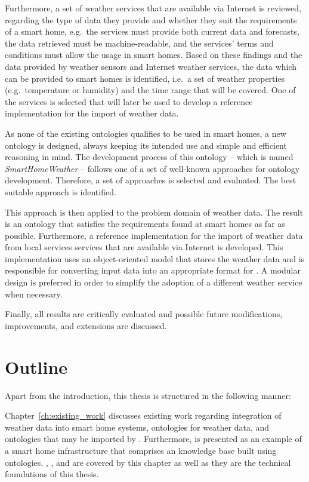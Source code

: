 Furthermore, a set of weather services that are available via Internet is reviewed, regarding the type of data they provide and whether they suit the requirements of a smart home, e.g.\ the services must provide both current data and forecasts, the data retrieved must be machine-readable, and the services' terms and conditions must allow the usage in smart homes. Based on these findings and the data provided by weather sensors and Internet weather services, the data which can be provided to smart homes is identified, i.e.\ a set of weather properties (e.g.\ temperature or humidity) and the time range that will be covered. One of the services is selected that will later be used to develop a reference implementation for the import of weather data.

As none of the existing ontologies qualifies to be used in smart homes, a new  ontology is designed, always keeping its intended use and simple and efficient reasoning in mind. The development process of this ontology -- which is named \emph{SmartHomeWeather} -- follows one of a set of well-known approaches for ontology development. Therefore, a set of approaches is selected and evaluated. The best suitable approach is identified.

This approach is then applied to the problem domain of weather data. The result is an ontology that satisfies the requirements found at smart homes as far as possible. Furthermore, a reference implementation for the import of weather data from local services services that are available via Internet is developed. This implementation uses an object-oriented model that stores the weather data and is responsible for converting input data into an appropriate format for \smarthomeweather. A modular design is preferred in order to simplify the adoption of a different weather service when necessary.

Finally, all results are critically evaluated and possible future modifications, improvements, and extensions are discussed.

\section{Outline}

Apart from the introduction, this thesis is structured in the following manner:

Chapter~\ref{ch:existing_work} discusses existing work regarding integration of weather data into smart home systems, ontologies for weather data, and ontologies that may be imported by \smarthomeweather. Furthermore, \thinkhome is presented as an example of a smart home infrastructure that comprises an knowledge base built using ontologies. , , and  are covered by this chapter as well as they are the technical foundations of this thesis.

